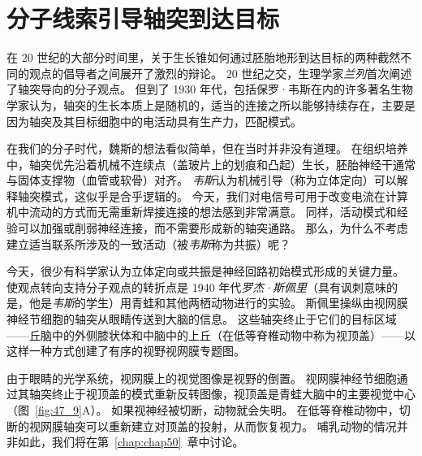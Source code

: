 \section{分子线索引导轴突到达目标}

在 20 世纪的大部分时间里，关于生长锥如何通过胚胎地形到达目标的两种截然不同的观点的倡导者之间展开了激烈的辩论。
20 世纪之交，生理学家\textit{兰列}首次阐述了轴突导向的分子观点。
但到了 1930 年代，包括保罗·韦斯在内的许多著名生物学家认为，轴突的生长本质上是随机的，适当的连接之所以能够持续存在，主要是因为轴突及其目标细胞中的电活动具有生产力，匹配模式。


在我们的分子时代，魏斯的想法看似简单，但在当时并非没有道理。
在组织培养中，轴突优先沿着机械不连续点（盖玻片上的划痕和凸起）生长，胚胎神经干通常与固体支撑物（血管或软骨）对齐。
\textit{韦斯}认为机械引导（称为立体定向）可以解释轴突模式，这似乎是合乎逻辑的。
今天，我们对电信号可用于改变电流在计算机中流动的方式而无需重新焊接连接的想法感到非常满意。
同样，活动模式和经验可以加强或削弱神经连接，而不需要形成新的轴突通路。
那么，为什么不考虑建立适当联系所涉及的一致活动（被\textit{韦斯}称为共振）呢？


今天，很少有科学家认为立体定向或共振是神经回路初始模式形成的关键力量。
使观点转向支持分子观点的转折点是 1940 年代\textit{罗杰·斯佩里}（具有讽刺意味的是，他是\textit{韦斯}的学生）用青蛙和其他两栖动物进行的实验。
斯佩里操纵由视网膜神经节细胞的轴突从眼睛传送到大脑的信息。
这些轴突终止于它们的目标区域——丘脑中的外侧膝状体和中脑中的上丘（在低等脊椎动物中称为视顶盖）——以这样一种方式创建了有序的视野视网膜专题图。


由于眼睛的光学系统，视网膜上的视觉图像是视野的倒置。
视网膜神经节细胞通过其轴突终止于视顶盖的模式重新反转图像，视顶盖是青蛙大脑中的主要视觉中心（图~\ref{fig:47_9}A）。
如果视神经被切断，动物就会失明。
在低等脊椎动物中，切断的视网膜轴突可以重新建立对顶盖的投射，从而恢复视力。
哺乳动物的情况并非如此，我们将在第~\ref{chap:chap50}~章中讨论。


